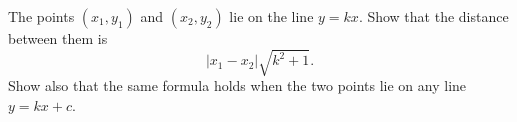 The points $(x_1,y_1)$ and $(x_2,y_2)$ lie on the line $y=kx$. Show that the distance between them is
\[|x_1-x_2|\sqrt{k^2+1}.\]
Show also that the same formula holds when the two points lie on any line $y=kx+c$.
